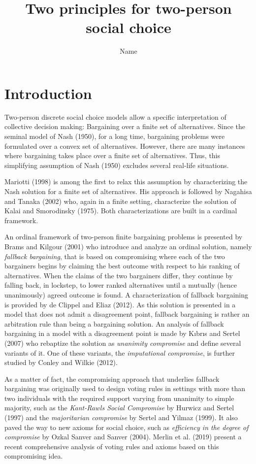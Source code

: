 \documentclass[version=3.21, pagesize, twoside=off, bibliography=totoc, DIV=calc, fontsize=12pt, a4paper]{scrartcl}
\title{Two principles for two-person social choice}
\author{Name}
\affil{Université Paris-Dauphine, PSL Research University, CNRS, LAMSADE, 75016 PARIS, FRANCE\\
}
\begin{document}
\maketitle

\section{Introduction}
\label{sec:intro}


Two-person discrete social choice models allow a specific interpretation of collective decision making: Bargaining over a finite set of alternatives. Since the seminal model of Nash (1950), for a long time, bargaining problems were formulated over a convex set of alternatives. However, there are many instances where bargaining takes place over a finite set of alternatives. Thus, this simplifying assumption of Nash (1950) excludes several real-life situations. 

Mariotti (1998) is among the first to relax this assumption by characterizing the Nash solution for a finite set of alternatives. His approach is followed by Nagahisa and Tanaka (2002) who, again in a finite setting, characterize the solution of Kalai and Smorodinsky (1975). Both characterizations are built in a cardinal framework. 
 
An ordinal framework of two-person finite bargaining problems is presented by Brams and Kilgour (2001) who introduce and analyze an ordinal solution, namely \textit{fallback bargaining}, that is based on compromising where each of the two bargainers begins by claiming the best outcome with respect to his ranking of alternatives. When the claims of the two bargainers differ, they continue by falling back, in lockstep, to lower ranked alternatives until a mutually (hence unanimously) agreed outcome is found. A characterization of fallback bargaining is provided by de Clippel and Eliaz (2012). As this solution is presented in a model that does not admit a disagreement point, fallback bargaining is rather an arbitration rule than being a bargaining solution. An analysis of fallback bargaining in a model with a disagreement point is made by Kıbrıs and Sertel (2007) who rebaptize the solution as \textit{unanimity compromise} and define several variants of it. One of these variants, the \textit{imputational compromise}, is further studied by Conley and Wilkie (2012).
 
As a matter of fact, the compromising approach that underlies fallback bargaining was originally used to design voting rules in settings with more than two individuals with the required support varying from unanimity to simple majority, such as the \textit{Kant-Rawls Social Compromise} by Hurwicz and Sertel (1997) and the \textit{majoritarian compromise} by Sertel and Yilmaz (1999). It also paved the way to new axioms for social choice, such as \textit{efficiency in the degree of compromise} by Ozkal Sanver and Sanver (2004).  Merlin et al. (2019) present a recent comprehensive analysis of voting rules and axioms based on this compromising idea.
 
\end{document}
